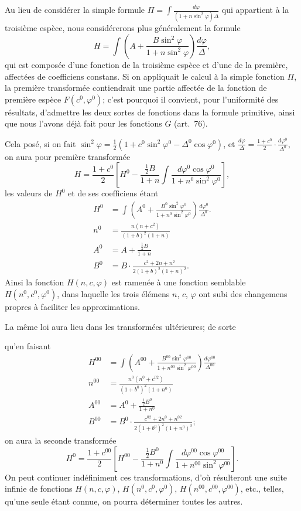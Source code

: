 \documentclass{article}
\begin{document}
 Au lieu de considérer la simple formule $\Pi=\displaystyle\int\frac{d\varphi}{(1+n\sin^{2}\varphi)\Delta}$ qui appartient à la troisième espèce, nous considérerons plus généralement la formule
\[ H=\int\left(A+\frac{B\sin^{2}\varphi}{1+n\sin^{2}\varphi}\right)\frac{d\varphi}{\Delta}, \]
qui est composée d'une fonction de la troisième espèce et d'une de la première, affectées de coefficiens constans. Si on appliquait le calcul à la simple fonction $\Pi$, la première transformée contiendrait une partie affectée de la fonction de première espèce $F(c^{0},\varphi^{0})$; c'est pourquoi il convient, pour l'uniformité des résultats, d'admettre les deux sortes de fonctions dans la formule primitive, ainsi que nous l'avons déjà fait pour les fonctions $G$ (art.\ 76).

Cela posé, si on fait $\sin^{2}\varphi=\frac{1}{2}(1+c^{0}\sin^{2}\varphi^{0}-\Delta^{0}\cos\varphi^{0})$, et $\frac{d\varphi}{\Delta}=\frac{1+c^{0}}{2}\cdot\frac{d\varphi^{0}}{\Delta^{0}}$, on aura pour première transformée
\[ H=\frac{1+c^{0}}{2}\left[H^{0}-\frac{\tfrac{1}{2}B}{1+n}\int\frac{d\varphi^{0}\cos\varphi^{0}}{1+n^{0}\sin^{2}\varphi^{0}}\right], \]
les valeurs de $H^{0}$ et de ses coefficiens étant
\[ \begin{aligned} H^{0}&=\int\left(A^{0}+\frac{B^{0}\sin^{2}\varphi^{0}}{1+n^{0}\sin^{2}\varphi^{0}}\right)\frac{d\varphi^{0}}{\Delta^{0}}.\\ n^{0}&=\frac{n(n+c^{2})}{(1+b)^{2}(1+n)}\\ A^{0}&=A+\frac{\tfrac{1}{2}B}{1+n}\\ B^{0}&=B\cdot\frac{c^{2}+2n+n^{2}}{2(1+b)^{2}(1+n)^{2}}. \end{aligned} \]
Ainsi la fonction $H(n,c,\varphi)$ est ramenée à une fonction semblable $H(n^{0},c^{0},\varphi^{0})$, dans laquelle les trois élémens $n$, $c$, $\varphi$ ont subi des changemens propres à faciliter les approximations.

La même loi aura lieu dans les transformées ultérieures; de sorte

qu'en faisant
\[ \begin{aligned} H^{00}&=\int\left(A^{00}+\frac{B^{00}\sin^{2}\varphi^{00}}{1+n^{00}\sin^{2}\varphi^{00}}\right)\frac{d\varphi^{00}}{\Delta^{00}}\\ n^{00}&=\frac{n^{0}(n^{0}+c^{02})}{(1+b^{0})^{2}(1+n^{0})}\\ A^{00}&=A^{0}+\frac{\tfrac{1}{2}B^{0}}{1+n^{0}}\\ B^{00}&=B^{0}\cdot\frac{c^{02}+2n^{0}+n^{02}}{2(1+b^{0})^{2}(1+n^{0})^{2}}; \end{aligned} \]
on aura la seconde transformée
\[ H^{0}=\frac{1+c^{00}}{2}\left[H^{00}-\frac{\tfrac{1}{2}B^{0}}{1+n^{0}}\int\frac{d\varphi^{00}\cos\varphi^{00}}{1+n^{00}\sin^{2}\varphi^{00}}\right]. \]
On peut continuer indéfiniment ces transformations, d'où résulteront une suite infinie de fonctions $H(n,c,\varphi)$, $H(n^{0},c^{0},\varphi^{0})$, $H(n^{00},c^{00},\varphi^{00})$, etc., telles, qu'une seule étant connue, on pourra déterminer toutes les autres.
\end{document}
